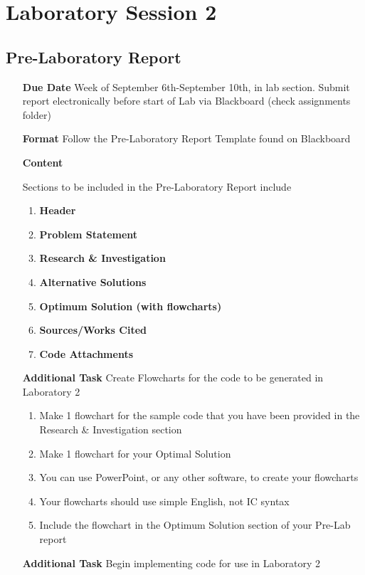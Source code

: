 \chapter{Laboratory Session 2}
\section{Pre-Laboratory Report}

\begin{itemize}
	\item[\textbf{Due Date}]{Week of September 6th-September 10th, \the\year \space in lab section. Submit report electronically before start of Lab via Blackboard (check assignments folder)}
	\item[\textbf{Format}]{Follow the Pre-Laboratory Report Template found on Blackboard}
	\item[\textbf{Content}]{Sections to be included in the Pre-Laboratory Report include
		\begin{enumerate}
			\item \textbf{Header}
			\item \textbf{Problem Statement}
			\item \textbf{Research \& Investigation}
			\item \textbf{Alternative Solutions}
			\item \textbf{Optimum Solution (with flowcharts)}
			\item \textbf{Sources/Works Cited}
			\item \textbf{Code Attachments}
		\end{enumerate}
		
	}
	\item[\textbf{Additional Task}]{Create Flowcharts for the code to be generated in Laboratory 2}
	\begin{enumerate}[label=\alph*.]
		\item Make 1 flowchart for the sample code that you have been provided in the Research \& Investigation section 
		\item Make 1 flowchart for your Optimal Solution
		\item You can use PowerPoint, or any other software, to create your flowcharts
		\item Your flowcharts should use simple English, not IC syntax
		\item Include the flowchart in the Optimum Solution section of your Pre-Lab report
	\end{enumerate}
	\item[\textbf{Additional Task}]{Begin implementing code for use in Laboratory 2}
\end{itemize}

